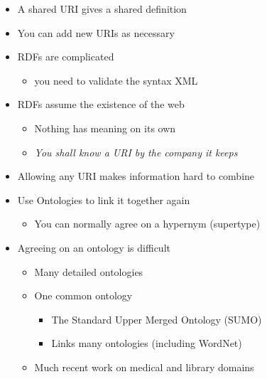 \documentclass[a4paper,landscape,headrule,footrule,xetex]{foils}
\begin{document}
\begin{itemize}
\item A shared URI gives a shared definition 
\item You can add new URIs as necessary
\item RDFs are complicated
  \begin{itemize}
  \item you need to validate the syntax \into XML
  \end{itemize}
\item RDFs assume the existence of the web
  \begin{itemize}
  \item Nothing has meaning on its own
  \item \textit{You shall know a URI by the company it keeps}
  \end{itemize}
\end{itemize}


\begin{itemize}
\item Allowing any URI makes information hard to combine
\item Use Ontologies to link it together again
  \begin{itemize}
  \item You can normally agree on a hypernym (supertype)
  \end{itemize}
\item Agreeing on an ontology is difficult
  \begin{itemize}
  \item Many detailed ontologies
  \item One common ontology
    \begin{itemize}
    \item The Standard Upper Merged Ontology (SUMO)
    \item Links many ontologies (including WordNet)
    \end{itemize}
  \item Much recent work on medical and library domains
  \end{itemize}
\end{itemize}

\end{document}
